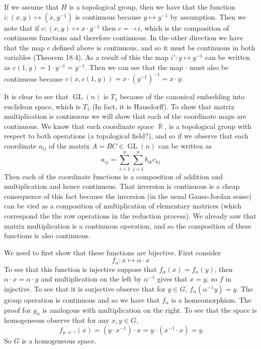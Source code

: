 \documentclass{article}
\DeclareMathOperator{\R}{\mathbb{R}}
\DeclareMathOperator{\GL}{\text{GL}}
\newcommand{\problempart}[1]{\noindent{\textbf{(#1)}}}
\begin{document}
If we assume that $H$ is a topological group, then we have that the function $i: (x,y) \mapsto (x,y^{-1})$ is continuous because $y \mapsto y^{-1}$ by assumption. Then we note that if $c: (x,y) \mapsto x\cdot y^{-1}$ then $c = \cdot \circ i$, which is the composition of continuous functions and therefore continuous. In the other direction we have that the map $c$ defined above is continuous, and so it must be continuous in both variables (Theorem 18.4). As a result of this the map $i': y \mapsto y^{-1}$ can be written as $c(1,y) = 1 \cdot y^{-1} = y^{-1}$. Then we can see that the map $\cdot$ must also be continuous because $c(x, c(1,y)) = x \cdot (y^{-1})^{-1} = x \cdot y$. 

\problempart{e} It is clear to see that $\GL(n)$ is $T_1$ because of the canonical embedding into euclidean space, which is $T_1$ (In fact, it is Hausdorff). To show that matrix multiplication is continuous we will show that each of the coordinate maps are continuous. We know that each coordinate space $\R$, is a topological group with respect to both operations (a topological field?), and so if we observe that each coordinate $a_{ij}$ of the matrix $A = BC \in \GL(n)$ can be written as 
\[
a_{ij} = \sum_{i = 1}^{n}\sum_{j = 1}^n b_{ik}c_{kj}
\]
Then each of the coordinate functions is a composition of addition and multiplication and hence continuous. That inversion is continuous is a cheap consequence of this fact because the inversion (in the usual Gauss-Jordan sense) can be vied as a composition of multiplication of elementary matrices (which correspond the the row operations in the reduction process). We already saw that matrix multiplication is a continuous operation, and so the composition of these functions is also continuous. 

We need to first show that these functions are bijective. First consider 
\[
f_\alpha: x \mapsto \alpha \cdot x
\]
To see that this function is injective suppose that $f_\alpha(x) = f_\alpha(y)$, then $\alpha\cdot x = \alpha \cdot y$ and multiplication on the left by $\alpha^{-1}$ gives that $x=y$, so $f$ in injective. To see that it is surjective observe that for $y \in G$, $f_\alpha(\alpha^{-1}y) = y$. The group operation is continuous and so we have that $f_\alpha$ is a homeomorphism. The proof for $g_\alpha$ is analogous with multiplication on the right. To see that the space is homogeneous observe that for any $x,y \in G$, 
\[
f_{y\cdot x^{-1}}(x) = (y\cdot x^{-1}) \cdot x = y \cdot (x^{-1} \cdot x) = y 
\]
So $G$ is a homogeneous space. 
\end{document}
